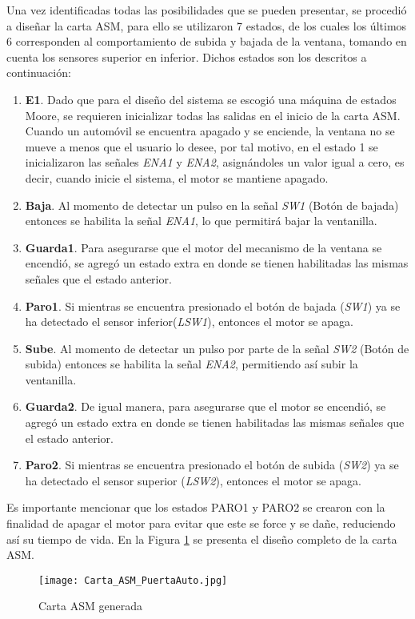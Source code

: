 \documentclass{article}
\begin{document}
Una vez identificadas todas las posibilidades que se pueden presentar, se procedió a diseñar la carta ASM, para ello se utilizaron 7 estados, de los cuales los últimos 6 corresponden al comportamiento de subida y bajada de la ventana, tomando en cuenta los sensores superior en inferior. Dichos estados son los descritos a continuación:
\begin{enumerate}
    \item \textbf{E1}. Dado que para el diseño del sistema se escogió una máquina de estados Moore, se requieren inicializar todas las salidas en el inicio de la carta ASM. Cuando un automóvil se encuentra apagado y se enciende, la ventana no se mueve a menos que el usuario lo desee, por tal motivo, en el estado 1 se inicializaron las señales \textit{ENA1} y \textit{ENA2}, asignándoles un valor igual a cero, es decir, cuando inicie el sistema, el motor se mantiene apagado.
    \item \textbf{Baja}. Al momento de detectar un pulso en la señal \textit{SW1} (Botón de bajada) entonces se habilita la señal \textit{ENA1}, lo que permitirá bajar la ventanilla.
    \item \textbf{Guarda1}. Para asegurarse que el motor del mecanismo de la ventana se encendió, se agregó un estado extra en donde se tienen habilitadas las mismas señales que el estado anterior.
    \item \textbf{Paro1}. Si mientras se encuentra presionado el botón de bajada (\textit{SW1}) ya se ha detectado el sensor inferior(\textit{LSW1}), entonces el motor se apaga.
    \item \textbf{Sube}. Al momento de detectar un pulso por parte de la señal \textit{SW2} (Botón de subida) entonces se habilita la señal \textit{ENA2}, permitiendo así subir la ventanilla.
    \item \textbf{Guarda2}. De igual manera, para asegurarse que el motor se encendió, se agregó un estado extra en donde se tienen habilitadas las mismas señales que el estado anterior.
    \item \textbf{Paro2}. Si mientras se encuentra presionado el botón de subida (\textit{SW2}) ya se ha detectado el sensor superior (\textit{LSW2}), entonces el motor se apaga.
\end{enumerate}
Es importante mencionar que los estados PARO1 y PARO2 se crearon con la finalidad de apagar el motor para evitar que este se force y se dañe, reduciendo así su tiempo de vida. En la Figura \ref{fig:Carta_ASM_PuertaVentana} se presenta el diseño completo de la carta ASM.
\begin{figure}[h]
    \centering
    \texttt{[image: Carta\_ASM\_PuertaAuto.jpg]}
    \caption{\label{fig:Carta_ASM_PuertaVentana}Carta ASM generada}
\end{figure}
\end{document}
